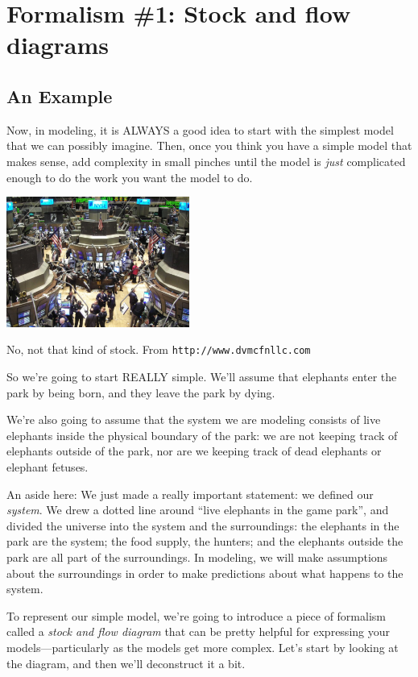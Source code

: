 \section{Formalism \#1: Stock and flow diagrams}

\subsection{An Example}

Now, in modeling, it is ALWAYS a good idea to start with the simplest model that we can possibly imagine.  Then, once you think you have a simple model that makes sense, add complexity in small pinches until the model is {\it just} complicated enough to do the work you want the model to do.

\begin{marginfigure}
\includegraphics[width=6cm]{figs/stockmarket}
\caption{No, not that kind of stock. From {\tt http://www.dvmcfnllc.com}}
\end{marginfigure}

So we're going to start REALLY simple.  We'll assume that elephants enter the park by being born, and they leave the park by dying.  

We're also going to assume that the system we are modeling consists of live elephants inside the physical boundary of the park:  we are not keeping track of elephants outside of the park, nor are we keeping track of dead elephants or elephant fetuses.

An aside here:  We just made a really important statement:  we defined our {\it system}.  We drew a dotted line around ``live elephants in the game park'', and divided the universe into the system and the surroundings:  the elephants in the park are the system; the food supply, the hunters; and the elephants outside the park are all part of the surroundings.  In modeling, we will make assumptions about the surroundings in order to make predictions about what happens to the system.    

To represent our simple model, we're going to introduce a piece of formalism called a {\it stock and flow diagram} that can be pretty helpful for expressing your models---particularly as the models get more complex.  Let's start by looking at the diagram, and then we'll deconstruct it a bit.

